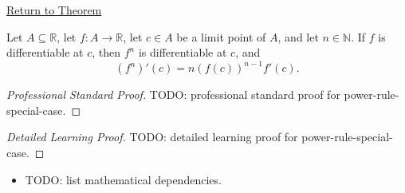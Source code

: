 \newpage
{}
\label{prf:power-rule-special-case}

\begin{remark*}[Return]
\hyperref[cor:power-rule-special-case]{Return to Theorem}
\end{remark*}

\begin{corollary*}
Let $A \subseteq \mathbb{R}$, let $f : A \to \mathbb{R}$, let $c \in A$ be a limit point of $A$, and let $n \in \mathbb{N}$. If $f$ is differentiable at $c$, then $f^n$ is differentiable at $c$, and
\[
(f^n)'(c) = n(f(c))^{n-1}f'(c).
\]
\end{corollary*}

\begin{proof}[Professional Standard Proof]
\LRAProofBodyStart
TODO: professional standard proof for power-rule-special-case.
\end{proof}

\begin{proof}[Detailed Learning Proof]
\LRAProofBodyStart
TODO: detailed learning proof for power-rule-special-case.
\end{proof}

\begin{remark*}
\end{remark*}

\begin{dependencies}
\begin{itemize}
  \item TODO: list mathematical dependencies.
\end{itemize}
\end{dependencies}

\clearpage
